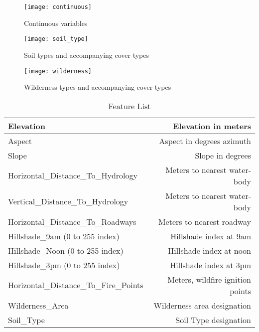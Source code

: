 \begin{figure*}
\centering
\texttt{[image: continuous]}
 \caption{Continuous variables}
 \label{fig:continuous_features}
\end{figure*}

\begin{figure*}
\centering
\texttt{[image: soil\_type]}
 \caption{Soil types and accompanying cover types}
 \label{fig:soil}
\end{figure*}

\begin{figure*}
\centering
\texttt{[image: wilderness]}
 \caption{Wilderness types and accompanying cover types}
 \label{fig:wilderness}
\end{figure*}


\begin{table}
  \begin{tabular}{ l | r }
    \hline
    Elevation & Elevation in meters \\
    \hline
    Aspect & Aspect in degrees azimuth \\
    \hline
    Slope & Slope in degrees \\
    \hline
    Horizontal\_Distance\_To\_Hydrology & Meters to nearest water-body \\
    \hline
    Vertical\_Distance\_To\_Hydrology & Meters to nearest water-body \\
    \hline
    Horizontal\_Distance\_To\_Roadways & Meters to nearest roadway \\
    \hline
    Hillshade\_9am (0 to 255 index) & Hillshade index at 9am \\
    \hline
    Hillshade\_Noon (0 to 255 index) & Hillshade index at noon \\
    \hline
    Hillshade\_3pm (0 to 255 index) & Hillshade index at 3pm \\
    \hline
    Horizontal\_Distance\_To\_Fire\_Points & Meters, wildfire ignition points \\
    \hline
    Wilderness\_Area & Wilderness area designation \\
    \hline
    Soil\_Type & Soil Type designation \\
    \hline
  \end{tabular}
  \caption{Feature List}
  \label{table:featurelist}
\end{table}


